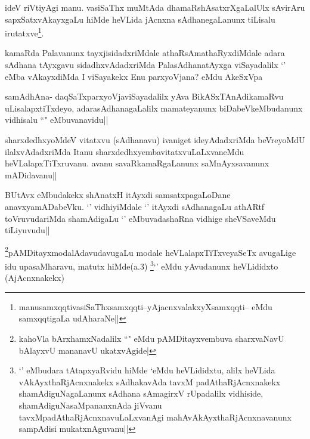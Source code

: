 \begin{artha}
ideV riVtiyAgi manu. vasiSaThx muMtAda dhamaRshAsatxrXgaLalUlx sAvirAru sapxSatxvAkayxgaLu hiMde heVLida jAcnxna sAdhanegaLanunx tiLisalu irutatxve\footnote{manusamxqqti\stext \stext \stext \stext vasiSaThxsamxqqti--\stext \stext \stext \stext yAjacnxvalakxyXsamxqqti-- \stext \stext \stext \stext eMdu samxqqtigaLa udAharaNe||}.
\end{artha}


\begin{artha}
kamaRda Palavanunx tayxjisidadxriMdale athaRsAmathaRyxdiMdale adara sAdhana tAyxgavu sidadhxvAdadxriMda PalasAdhanatAyxga viSayadalilx `\stext' eMba vAkayxdiMda I viSayakekx Enu parxyoVjana? eMdu AkeSxVpa
\end{artha}

\begin{artha}
samAdhAna- daqSaTxparxyoVjaviSayadalilx yAva BikASxTAnAdikamaRvu uLisalapxtiTxdeyo, adarasAdhanagaLalilx mamateyanunx biDabeVkeMbudanunx vidhisalu ``\stext" eMbuvanavidu||
\end{artha}

\begin{artha}
sharxdedhxyoMdeV vitatxvu (sAdhanavu) ivaniget ideyAdadxriMda beVreyoMdU ilalxvAdadxriMda Itanu sharxdedhxyembavitatxvuLaLxvaneMdu heVLalapxTiTxruvanu. avanu savaRkamaRgaLanunx saMnAyxsavanunx mADidavanu||
\end{artha}

\begin{artha}
BUtAvx eMbudakekx shAnatxH itAyxdi samsatxpagaLoDane anavxyamADabeVku. `\stext' vidhiyiMdale `\stext' itAyxdi sAdhanagaLu athARtf toVruvudariMda shamAdigaLu `\stext' eMbuvadashaRna vidhige sheVSaveMdu tiLiyuvudu||
\end{artha}


\begin{artha}
\footnote{kahoVla bArxhamxNadalilx ``\stext" eMdu pAMDitayxvembuva sharxvaNavU bAlayxvU mananavU ukatxvAgide|}pAMDitayxmodalAdavudavugaLu modale heVLalapxTiTxveyaSeTx avugaLige idu upasaMharavu, matutx hiMde(a.3) \footnote{`\stext' eMbudara tAtapxyaRvidu hiMde `\stext eMdu heVLididxtu, alilx heVLida vAkAyxthaRjAcnxnakekx sAdhakavAda tavxM padAthaRjAcnxnakekx shamAdiguNagaLanunx sAdhana sAmagirxV rUpadalilx vidhiside, shamAdiguNasaMpananxnAda jiVvanu tavxMpadAthaRjAcnxnavuLaLxvanAgi mahAvAkAyxthaRjAcnxnavanunx sampAdisi mukatxnAguvanu||}`\stext' eMdu yAvudanunx heVLididxto (AjAcnxnakekx)
\end{artha}

